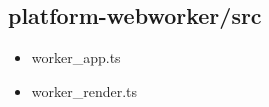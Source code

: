 \subsection{platform-webworker/src}


\begin{itemize}
  \item worker\_app.ts
  \item worker\_render.ts
\end{itemize}















